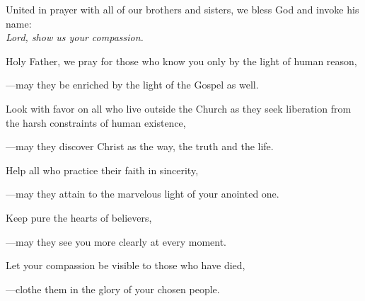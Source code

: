 \intercessions\indent

\begin{hangpar}

United in prayer with all of our brothers and sisters, we bless God and invoke his name:\\
\emph{Lord, show us your compassion.}

\medskip Holy Father, we pray for those who know you only by the light of human reason,

{\color{red}---\thinspace}may they be enriched by the light of the Gospel as well.

\medskip Look with favor on all who live outside the Church as they seek liberation from the harsh constraints of human existence,

{\color{red}---\thinspace}may they discover Christ as the way, the truth and the life.

\medskip Help all who practice their faith in sincerity,

{\color{red}---\thinspace}may they attain to the marvelous light of your anointed one.

\medskip Keep pure the hearts of believers,

{\color{red}---\thinspace}may they see you more clearly at every moment.

\medskip Let your compassion be visible to those who have died,

{\color{red}---\thinspace}clothe them in the glory of your chosen people.

\medskip

\end{hangpar}